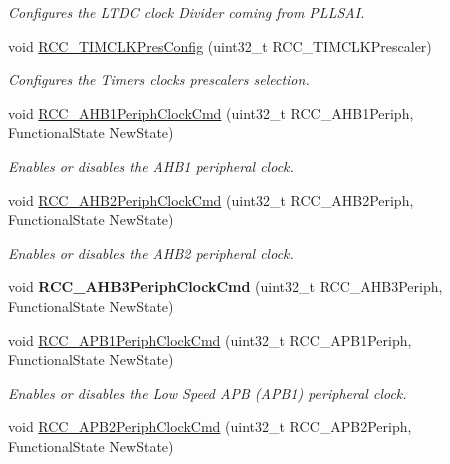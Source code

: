 \begin{DoxyCompactItemize}
\begin{DoxyCompactList}\small\item\em Configures the L\+T\+DC clock Divider coming from P\+L\+L\+S\+AI. \end{DoxyCompactList}\item 
void \mbox{\hyperlink{group___r_c_c_gaf0599100e7afdf8ed988e351a899e922}{R\+C\+C\+\_\+\+T\+I\+M\+C\+L\+K\+Pres\+Config}} (uint32\+\_\+t R\+C\+C\+\_\+\+T\+I\+M\+C\+L\+K\+Prescaler)
\begin{DoxyCompactList}\small\item\em Configures the Timers clocks prescalers selection. \end{DoxyCompactList}\item 
void \mbox{\hyperlink{group___r_c_c_ga80c89116820d48bb38db2e7d5e5a49b9}{R\+C\+C\+\_\+\+A\+H\+B1\+Periph\+Clock\+Cmd}} (uint32\+\_\+t R\+C\+C\+\_\+\+A\+H\+B1\+Periph, Functional\+State New\+State)
\begin{DoxyCompactList}\small\item\em Enables or disables the A\+H\+B1 peripheral clock. \end{DoxyCompactList}\item 
void \mbox{\hyperlink{group___r_c_c_gaadffedbd87e796f01d9776b8ee01ff5e}{R\+C\+C\+\_\+\+A\+H\+B2\+Periph\+Clock\+Cmd}} (uint32\+\_\+t R\+C\+C\+\_\+\+A\+H\+B2\+Periph, Functional\+State New\+State)
\begin{DoxyCompactList}\small\item\em Enables or disables the A\+H\+B2 peripheral clock. \end{DoxyCompactList}\item 
\mbox{\label{group___r_c_c_ga4eb8c119f2e9bf2bd2e042d27f151338}} 
void {\bfseries R\+C\+C\+\_\+\+A\+H\+B3\+Periph\+Clock\+Cmd} (uint32\+\_\+t R\+C\+C\+\_\+\+A\+H\+B3\+Periph, Functional\+State New\+State)
\item 
void \mbox{\hyperlink{group___r_c_c_gaee7cc5d73af7fe1986fceff8afd3973e}{R\+C\+C\+\_\+\+A\+P\+B1\+Periph\+Clock\+Cmd}} (uint32\+\_\+t R\+C\+C\+\_\+\+A\+P\+B1\+Periph, Functional\+State New\+State)
\begin{DoxyCompactList}\small\item\em Enables or disables the Low Speed A\+PB (A\+P\+B1) peripheral clock. \end{DoxyCompactList}\item 
void \mbox{\hyperlink{group___r_c_c_ga56ff55caf8d835351916b40dd030bc87}{R\+C\+C\+\_\+\+A\+P\+B2\+Periph\+Clock\+Cmd}} (uint32\+\_\+t R\+C\+C\+\_\+\+A\+P\+B2\+Periph, Functional\+State New\+State)

\end{DoxyCompactItemize}
